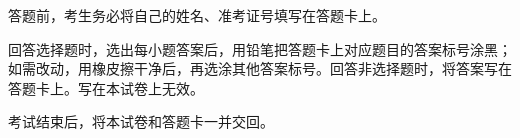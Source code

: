 \documentclass[class=exam-zh, crop]{standalone}
\begin{document}
\begin{notice}
  \item 答题前，考生务必将自己的姓名、准考证号填写在答题卡上。
  \item 回答选择题时，选出每小题答案后，用铅笔把答题卡上对应题目的答案标号涂黑；如需改动，用橡皮擦干净后，再选涂其他答案标号。回答非选择题时，将答案写在答题卡上。写在本试卷上无效。
  \item 考试结束后，将本试卷和答题卡一并交回。
\end{notice}
\end{document}
